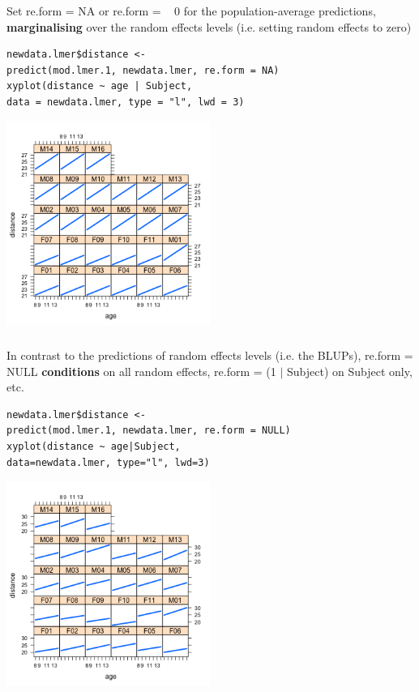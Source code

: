 \documentclass{beamer}
\begin{document}
\begin{frame}[fragile]
    \frametitle{}
    Set re.form = NA or re.form = ~ 0 for the population-average predictions, \textbf{marginalising} over the random effects levels (i.e. setting random effects to zero)
    
    \small\begin{Verbatim}[frame=single]
newdata.lmer$distance <- 
predict(mod.lmer.1, newdata.lmer, re.form = NA)
xyplot(distance ~ age | Subject, 
data = newdata.lmer, type = "l", lwd = 3)
    \end{Verbatim}
    \begin{center}
       \includegraphics[width=0.5\textwidth]{lectures/day_6_praxis_and_fitting_of_mems/figures/unnamed-chunk-25-1.png} 
    \end{center}
\end{frame}

\begin{frame}[fragile]
    \frametitle{}
    In contrast to the predictions of random effects levels (i.e. the BLUPs), re.form = NULL \textbf{conditions} on all random effects, re.form = (1 $|$ Subject) on Subject only, etc.
    
    \small\begin{Verbatim}[frame=single]
newdata.lmer$distance <- 
predict(mod.lmer.1, newdata.lmer, re.form = NULL)
xyplot(distance ~ age|Subject, 
data=newdata.lmer, type="l", lwd=3)
    \end{Verbatim}
    \begin{center}
       \includegraphics[width=0.5\textwidth]{lectures/day_6_praxis_and_fitting_of_mems/figures/unnamed-chunk-26-1.png} 
    \end{center}
\end{frame}
\end{document}
